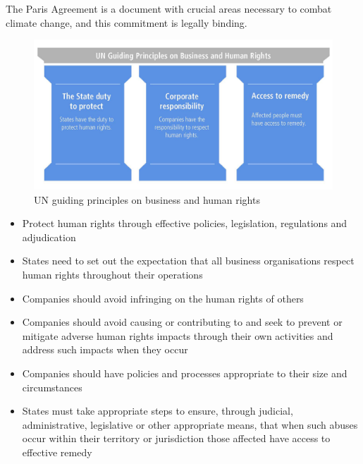 \documentclass[11pt]{article}
\theoremstyle{definition}
\begin{document}
The Paris Agreement is a document with crucial areas necessary to combat climate change, and this commitment is legally binding.

\begin{figure}[H]
	\centering
	\includegraphics[width=0.8\linewidth]{img/principles_business_human_rights}
	\caption{UN guiding principles on business and human rights}
	\label{fig:principlesbusinesshumanrights}
\end{figure}

\begin{itemize}
	\item Protect human rights through effective policies, legislation, regulations and adjudication
	\item States need to set out the expectation that all business organisations respect human rights throughout their operations
	\item Companies should avoid infringing on the human rights of others
	\item Companies should avoid causing or contributing to and seek to prevent or mitigate adverse human rights impacts through their own activities and address such impacts when they occur
	\item Companies should have policies and processes appropriate to their size and circumstances
	\item States must take appropriate steps to ensure, through judicial, administrative, legislative or other appropriate means, that when such abuses occur within their territory or jurisdiction those affected have access to effective remedy
\end{itemize}
\end{document}
